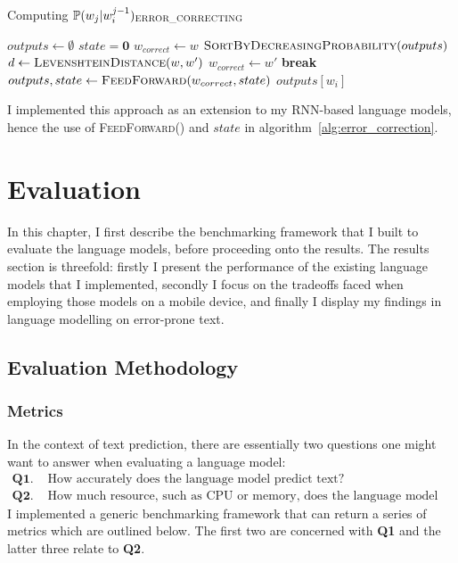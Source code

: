 \documentclass[a4paper, 12pt]{report}
\newcommand{\tbf}[1]{\textbf{#1}}
\begin{document}
\begin{algorithm}
\caption{Computing $\mathbb{P}(w_j | w_i^{j - 1})_{\text{\scshape ERROR\_CORRECTING}}$}
\label{alg:error_correction}
\begin{algorithmic}[1]
\State $outputs \gets \emptyset$
\State $state = \mathbf{0}$
	\State $w_{correct} \gets w$
	\If {$w \notin dictionary\ \tbf{and}\ outputs \neq \emptyset$}
		\State $\text{\scshape SortByDecreasingProbability}(outputs)$
			\State $d \gets \text{\scshape LevenshteinDistance}(w, w')$
				\State $w_{correct} \gets w'$
				\State \textbf{break}
			\EndIf
		\EndFor
	\EndIf
	\State $outputs, state \gets \text{\scshape FeedForward}(w_{correct}, state)$
\EndFor
\State \Return $outputs[w_i]$
\EndProcedure
\end{algorithmic}
\end{algorithm}

I implemented this approach as an extension to my RNN-based language models, hence the use of {\scshape FeedForward}() and $state$ in algorithm~\ref{alg:error_correction}.

\chapter{Evaluation} \label{evaluation}

In this chapter, I first describe the benchmarking framework that I built to evaluate the language models, before proceeding onto the results. The results section is threefold: firstly I present the performance of the existing language models that I implemented, secondly I focus on the tradeoffs faced when employing those models on a mobile device, and finally I display my findings in language modelling on error-prone text.

\section{Evaluation Methodology}

\subsection{Metrics} \label{metrics}

In the context of text prediction, there are essentially two questions one might want to answer when evaluating a language model:
\begin{align*}
	\tbf{Q1. } & \text{How accurately does the language model predict text?} \\
	\tbf{Q2. } & \text{How much resource, such as CPU or memory, does the language model consume?}
\end{align*}
I implemented a generic benchmarking framework that can return a series of metrics which are outlined below. The first two are concerned with \tbf{Q1} and the latter three relate to \tbf{Q2}.
\end{document}
